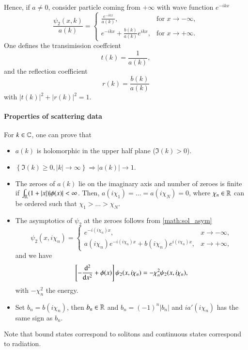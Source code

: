 Hence, if $a\neq 0$, consider particle coming from $+\infty$ with wave function $e^{-ikx}$
\begin{equation}
	\frac{\psi_2(x,k)}{a(k)} = 
	\begin{cases}
		\frac{e^{-ikx}}{a(k)}, & \text{for } x \rightarrow - \infty, \\
		e^{-ikx} + \frac{b(k)}{a(k)} e^{ikx}, & \text{for } x \rightarrow + \infty.
	\end{cases}
	\label{math:sol_asym}
\end{equation}
One defines the transimission coeffcient
\begin{equation*}
	t(k) = \frac{1}{a(k)},
\end{equation*}
and the reflection coefficient
\begin{equation*}
	r(k) = \frac{b(k)}{a(k)}
\end{equation*}
with $|t(k)|^2 + |r(k)|^2 = 1$.

\paragraph{Properties of scattering data}
For $k \in \mathbb{C}$, one can prove that 
\begin{itemize}
	\item $a(k)$ is holomorphic in the upper half plane ($\Im(k) > 0$).
	\item $\left\{\Im(k) \geq 0, |k| \rightarrow \infty \right\} \Rightarrow  |a(k)| \rightarrow 1$.
	\item The zeroes of $a(k)$ lie on the imaginary axis and number of zeroes is finite if $\int_{\mathbb{R}} (1+|x|)|\phi(x)| < \infty$. Then, $a(i \chi_1) = \dots = a(i\chi_N)  = 0$, where $\chi_n \in \mathbb{R}$ can be ordered such that $ \chi_1 > \dots > \chi_N$.
	\item The asymptotics of $\psi_2$ at the zeroes follows from \eqref{math:sol_asym}
		\begin{equation*}
			\psi_2(x, i \chi_n) = 
			\begin{cases}
				e^{-i(i\chi_n)x}, & x \rightarrow -\infty, \\
				a(i\chi_n) e^{-i(i\chi_n)x} + b(i\chi_n) e^{i(i\chi_n)x}, & x \rightarrow + \infty,
			\end{cases}
		\end{equation*}
		and we have 
		\begin{equation*}
			\left[ -\dv[2]{x} + \phi(x)  \right] \psi_2(x, i\chi_n) = -\chi^2_n \psi_2 (x, i\chi_n),
		\end{equation*}
		with $-\chi_n^2$ the energy.
	\item Set $b_n = b(i\chi_n)$, then $b_n \in \mathbb{R}$ and $b_n = (-1)^n |b_n|$ and $i a'(i\chi_n)$ has the same sign as $b_n$.
\end{itemize}
Note that bound states correspond to solitons and continuous states correspond to radiation.

